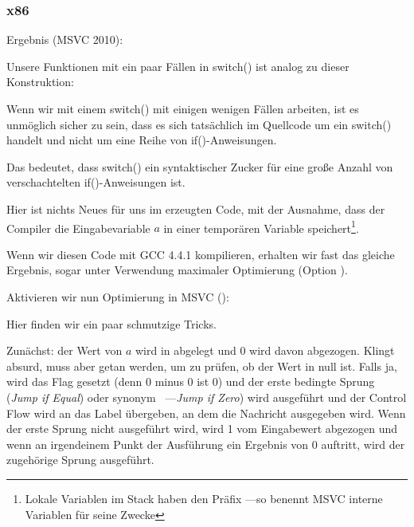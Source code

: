 \subsubsection{x86}


Ergebnis (MSVC 2010):


Unsere Funktionen mit ein paar Fällen in switch() ist analog zu dieser Konstruktion:



Wenn wir mit einem switch() mit einigen wenigen Fällen arbeiten, ist es unmöglich sicher zu sein, dass es sich
tatsächlich im Quellcode um ein switch() handelt und nicht um eine Reihe von if()-Anweisungen.

\myindex{\SyntacticSugar}
Das bedeutet, dass switch() ein syntaktischer Zucker für eine große Anzahl von verschachtelten if()-Anweisungen ist.

Hier ist nichts Neues für uns im erzeugten Code, mit der Ausnahme, dass der Compiler die Eingabevariable $a$ in einer
temporären Variable  speichert\footnote{Lokale Variablen im Stack haben den Präfix ---so benennt MSVC
interne Variablen für seine Zwecke}.

Wenn wir diesen Code mit GCC 4.4.1 kompilieren, erhalten wir fast das gleiche Ergebnis, sogar unter Verwendung maximaler
Optimierung (Option \Othree).


Aktivieren wir nun Optimierung in MSVC (\Ox): 

\label{JMP_instead_of_RET}

Hier finden wir ein paar schmutzige Tricks.

Zunächst: der Wert von $a$ wird in \EAX abgelegt und 0 wird davon abgezogen. Klingt absurd, muss aber getan werden, um
zu prüfen, ob der Wert in \EAX null ist. Falls ja, wird das \ZF Flag gesetzt (denn 0 minus 0 ist 0) und der erste
bedingte Sprung \JE (\emph{Jump if Equal}) oder synonym \JZ~---\emph{Jump if Zero}) wird ausgeführt und der Control Flow
wird an das Label  übergeben, an dem die Nachricht  ausgegeben wird.
Wenn der erste Sprung nicht ausgeführt wird, wird 1 vom Eingabewert abgezogen und wenn an irgendeinem Punkt der
Ausführung ein Ergebnis von 0 auftritt, wird der zugehörige Sprung ausgeführt. 

